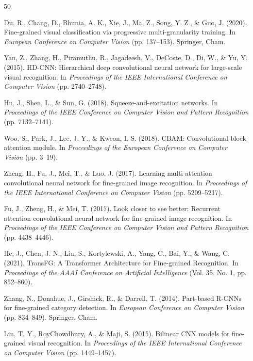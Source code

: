 \documentclass[pdflatex,iicol,sn-mathphys-num]{sn-jnl}
\theoremstyle{thmstyleone}%
\theoremstyle{thmstyletwo}%
\theoremstyle{thmstylethree}%
\begin{document}
{\footnotesize
\begin{thebibliography}{50}

     Du, R., Chang, D., Bhunia, A. K., Xie, J., Ma, Z., Song, Y. Z., \& Guo, J. (2020). Fine-grained visual classification via progressive multi-granularity training. In \textit{European Conference on Computer Vision} (pp. 137--153). Springer, Cham.

     Yan, Z., Zhang, H., Piramuthu, R., Jagadeesh, V., DeCoste, D., Di, W., \& Yu, Y. (2015). HD-CNN: Hierarchical deep convolutional neural network for large-scale visual recognition. In \textit{Proceedings of the IEEE International Conference on Computer Vision} (pp. 2740--2748).
    
     Hu, J., Shen, L., \& Sun, G. (2018). Squeeze-and-excitation networks. In \textit{Proceedings of the IEEE Conference on Computer Vision and Pattern Recognition} (pp. 7132--7141).
    
     Woo, S., Park, J., Lee, J. Y., \& Kweon, I. S. (2018). CBAM: Convolutional block attention module. In \textit{Proceedings of the European Conference on Computer Vision} (pp. 3--19).
    
     Zheng, H., Fu, J., Mei, T., \& Luo, J. (2017). Learning multi-attention convolutional neural network for fine-grained image recognition. In \textit{Proceedings of the IEEE International Conference on Computer Vision} (pp. 5209--5217).
    
     Fu, J., Zheng, H., \& Mei, T. (2017). Look closer to see better: Recurrent attention convolutional neural network for fine-grained image recognition. In \textit{Proceedings of the IEEE Conference on Computer Vision and Pattern Recognition} (pp. 4438--4446).
    
     He, J., Chen, J. N., Liu, S., Kortylewski, A., Yang, C., Bai, Y., \& Wang, C. (2021). TransFG: A Transformer Architecture for Fine-grained Recognition. In \textit{Proceedings of the AAAI Conference on Artificial Intelligence} (Vol. 35, No. 1, pp. 852--860).
    
     Zhang, N., Donahue, J., Girshick, R., \& Darrell, T. (2014). Part-based R-CNNs for fine-grained category detection. In \textit{European Conference on Computer Vision} (pp. 834--849). Springer, Cham.
    
     Lin, T. Y., RoyChowdhury, A., \& Maji, S. (2015). Bilinear CNN models for fine-grained visual recognition. In \textit{Proceedings of the IEEE International Conference on Computer Vision} (pp. 1449--1457).
    

\end{thebibliography}}
\end{document}
